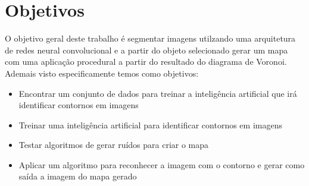 \section{Objetivos}

O objetivo geral deste trabalho é segmentar imagens utilzando uma arquitetura de redes neural convolucional e a partir do objeto selecionado gerar um mapa com uma aplicação procedural a partir do resultado do diagrama de Voronoi.
Ademais visto especificamente temos como objetivos:

\begin{itemize}
	\item Encontrar um conjunto de dados para treinar a inteligência artificial que irá identificar contornos em imagens
	\item Treinar uma inteligência artificial para identificar contornos em imagens
	\item Testar algoritmos de gerar ruídos para criar o mapa
	\item Aplicar um algoritmo para reconhecer a imagem com o contorno e gerar como saída a imagem do mapa gerado
\end{itemize}

